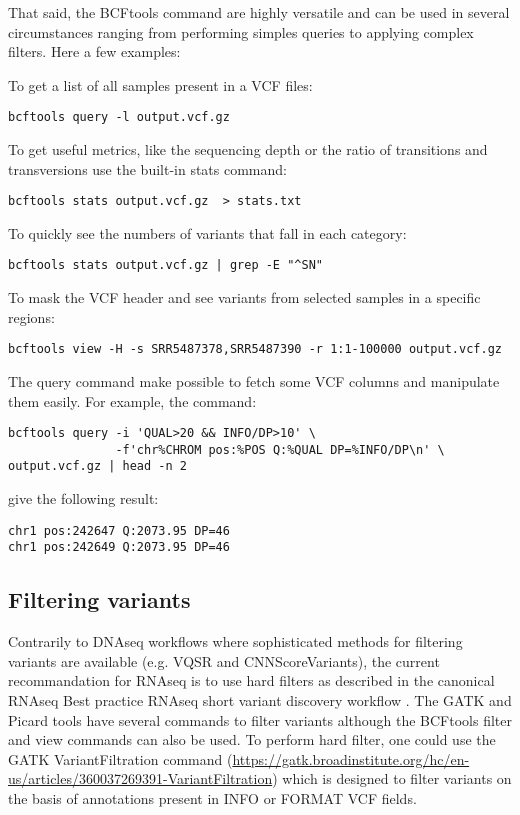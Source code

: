 That said, the BCFtools command are highly versatile and can be used in several circumstances ranging from performing simples queries to applying complex filters. Here a few examples:

To get a list of all samples present in a VCF files:

\begin{verbatim}
bcftools query -l output.vcf.gz
\end{verbatim}

To get useful metrics, like the sequencing depth or the ratio of transitions and transversions use the built-in stats command:
\begin{verbatim}
bcftools stats output.vcf.gz  > stats.txt
\end{verbatim}

To quickly see the numbers of variants that fall in each category:
\begin{verbatim}
bcftools stats output.vcf.gz | grep -E "^SN"
\end{verbatim}

To mask the VCF header and see variants from selected samples in a specific regions:
\begin{verbatim}
bcftools view -H -s SRR5487378,SRR5487390 -r 1:1-100000 output.vcf.gz
\end{verbatim}


The query command make possible to fetch some VCF columns and manipulate them easily. For example, the command:

\begin{verbatim}
bcftools query -i 'QUAL>20 && INFO/DP>10' \
	           -f'chr%CHROM pos:%POS Q:%QUAL DP=%INFO/DP\n' \
output.vcf.gz | head -n 2
\end{verbatim}

give the following result:
\begin{verbatim}
chr1 pos:242647 Q:2073.95 DP=46
chr1 pos:242649 Q:2073.95 DP=46
\end{verbatim}






\subsection{Filtering variants}


Contrarily to DNAseq workflows where sophisticated methods for filtering variants are available (e.g. VQSR and CNNScoreVariants), the current recommandation for RNAseq is to use hard filters as described in the canonical RNAseq Best practice RNAseq short variant discovery workflow \cite{GATK_RNAseq_variant_discovery}. The GATK and Picard tools have several commands to filter variants although the BCFtools filter and view commands can also be used. To perform hard filter, one could use the GATK VariantFiltration command  (\href{https://gatk.broadinstitute.org/hc/en-us/articles/360037269391-VariantFiltration}{https://gatk.broadinstitute.org/hc/en-us/articles/360037269391-VariantFiltration}) which is designed to filter variants on the basis of annotations present in INFO or FORMAT VCF fields.


